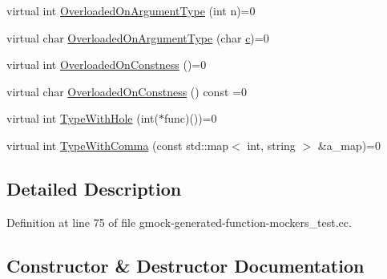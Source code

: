 \begin{DoxyCompactItemize}
\item 
virtual int \hyperlink{classtesting_1_1gmock__generated__function__mockers__test_1_1_foo_interface_ad9cc9a11570403fb8378ed6620892ec6}{Overloaded\+On\+Argument\+Type} (int n)=0
\item 
virtual char \hyperlink{classtesting_1_1gmock__generated__function__mockers__test_1_1_foo_interface_a8cb6caa44216ba29fc228b016523abe9}{Overloaded\+On\+Argument\+Type} (char \hyperlink{jquery_8js_abce695e0af988ece0826d9ad59b8160d}{c})=0
\item 
virtual int \hyperlink{classtesting_1_1gmock__generated__function__mockers__test_1_1_foo_interface_afbbe6ec72ae237de05e109dea5b03f4f}{Overloaded\+On\+Constness} ()=0
\item 
virtual char \hyperlink{classtesting_1_1gmock__generated__function__mockers__test_1_1_foo_interface_ab40007385078cdb675616a21ef254df4}{Overloaded\+On\+Constness} () const =0
\item 
virtual int \hyperlink{classtesting_1_1gmock__generated__function__mockers__test_1_1_foo_interface_a9e92ef227dc68806f85ebff9c8a6102a}{Type\+With\+Hole} (int($\ast$func)())=0
\item 
virtual int \hyperlink{classtesting_1_1gmock__generated__function__mockers__test_1_1_foo_interface_a654ade1e68b5adb922149898bfe4ccda}{Type\+With\+Comma} (const std\+::map$<$ int, string $>$ \&a\+\_\+map)=0
\end{DoxyCompactItemize}


\subsection{Detailed Description}


Definition at line 75 of file gmock-\/generated-\/function-\/mockers\+\_\+test.\+cc.



\subsection{Constructor \& Destructor Documentation}
